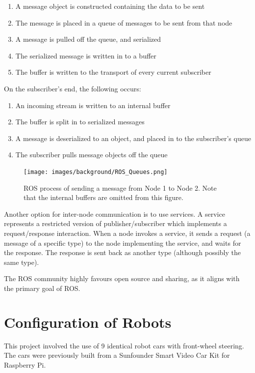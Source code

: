 \documentclass[../dissertation.tex]{subfiles}
\begin{document}
\begin{enumerate}
  \item A message object is constructed containing the data to be sent
  \item The message is placed in a queue of messages to be sent from that node
  \item A message is pulled off the queue, and serialized
  \item The serialized message is written in to a buffer
  \item The buffer is written to the transport of every current subscriber
\end{enumerate}

On the subscriber's end, the following occurs:

\begin{enumerate}
  \item An incoming stream is written to an internal buffer
  \item The buffer is split in to serialized messages
  \item A message is deserialized to an object, and placed in to the subscriber's queue
  \item The subscriber pulls message objects off the queue
\end{enumerate}

\begin{figure}[H]
\centering
\texttt{[image: images/background/ROS\_Queues.png]}
\caption{ROS process of sending a message from Node 1 to Node 2. Note that the internal buffers are omitted from this figure.}
\end{figure}

Another option for inter-node communication is to use services. A service represents a restricted version of publisher/subscriber which implements a request/response interaction. When a node invokes a service, it sends a request (a message of a specific type) to the node implementing the service, and waits for the response. The response is sent back as another type (although possibly the same type).

The ROS community highly favours open source and sharing, as it aligns with the primary goal of ROS.

\section{Configuration of Robots}
\label{background-robot-config}

This project involved the use of 9 identical robot cars with front-wheel steering. The cars were previously built from a Sunfounder Smart Video Car Kit for Raspberry Pi\cite{SunfounderRobotCarKit}.
\end{document}
